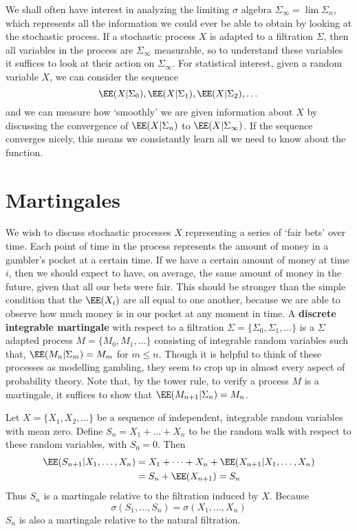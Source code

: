 We shall often have interest in analyzing the limiting $\sigma$ algebra $\Sigma_\infty = \lim \Sigma_n$, which represents all the information we could ever be able to obtain by looking at the stochastic process. If a stochastic process $X$ is adapted to a filtration $\Sigma$, then all variables in the process are $\Sigma_\infty$ measurable, so to understand these variables it suffices to look at their action on $\Sigma_\infty$. For statistical interest, given a random variable $X$, we can consider the sequence
%
\[ \EE(X|\Sigma_0), \EE(X|\Sigma_1), \EE(X|\Sigma_2), \dots \]
%
and we can measure how `smoothly' we are given information about $X$ by discussing the convergence of $\EE(X|\Sigma_n)$ to $\EE(X|\Sigma_\infty)$. If the sequence converges nicely, this means we consistantly learn all we need to know about the function.

\section{Martingales}

We wish to discuss stochastic processes $X$ representing a series of `fair bets' over time. Each point of time in the process represents the amount of money in a gambler's pocket at a certain time. If we have a certain amount of money at time $i$, then we should expect to have, on average, the same amount of money in the future, given that all our bets were fair. This should be stronger than the simple condition that the $\EE(X_i)$ are all equal to one another, because we are able to observe how much money is in our pocket at any moment in time. A {\bf discrete integrable martingale} with respect to a filtration $\Sigma = \{ \Sigma_0, \Sigma_1, \dots \}$ is a $\Sigma$ adapted process $M = \{ M_0, M_1, \dots \}$ consisting of integrable random variables such that, $\EE(M_n | \Sigma_m) = M_m$ for $m \leq n$. Though it is helpful to think of these processes as modelling gambling, they seem to crop up in almost every aspect of probability theory. Note that, by the tower rule, to verify a process $M$ is a martingale, it suffices to show that $\EE(M_{n+1}|\Sigma_n) = M_n$.

\begin{example}
    Let $X = \{ X_1, X_2, \dots \}$ be a sequence of independent, integrable random variables with mean zero. Define $S_n = X_1 + \dots + X_n$ to be the random walk with respect to these random variables, with $S_0 = 0$. Then
    \begin{align*}
        \EE(S_{n+1}|X_1, \dots, X_n) &= X_1 + \dots + X_n + \EE(X_{n+1}|X_1, \dots, X_n)\\
        &= S_n + \EE(X_{n+1}) = S_n
    \end{align*}
    Thus $S_n$ is a martingale relative to the filtration induced by $X$. Because
    \[ \sigma(S_1, \dots, S_n) = \sigma(X_1, \dots, X_n) \]
    $S_n$ is also a martingale relative to the natural filtration.
\end{example}


